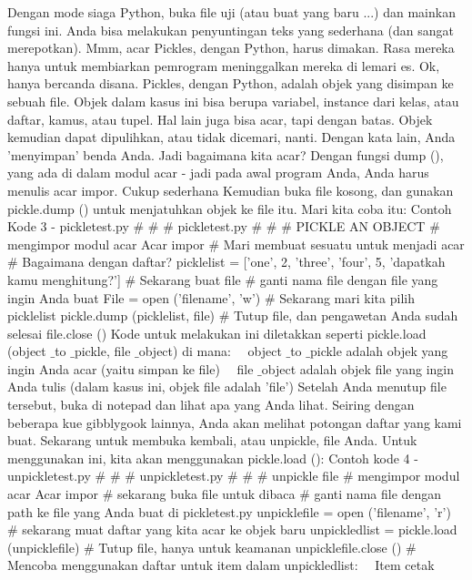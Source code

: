 Dengan mode siaga Python, buka file uji (atau buat yang baru ...) dan mainkan fungsi ini. Anda bisa melakukan penyuntingan teks yang sederhana (dan sangat merepotkan). 
Mmm, acar 
Pickles, dengan Python, harus dimakan. Rasa mereka hanya untuk membiarkan pemrogram meninggalkan mereka di lemari es. 
Ok, hanya bercanda disana. Pickles, dengan Python, adalah objek yang disimpan ke sebuah file. Objek dalam kasus ini bisa berupa variabel, instance dari kelas, atau daftar, kamus, atau tupel. Hal lain juga bisa acar, tapi dengan batas. Objek kemudian dapat dipulihkan, atau tidak dicemari, nanti. Dengan kata lain, Anda 'menyimpan' benda Anda. 
Jadi bagaimana kita acar? Dengan fungsi dump (), yang ada di dalam modul acar - jadi pada awal program Anda, Anda harus menulis acar impor. Cukup sederhana Kemudian buka file kosong, dan gunakan pickle.dump () untuk menjatuhkan objek ke file itu. Mari kita coba itu: 
Contoh Kode 3 - pickletest.py 
 $  \#  $ $  \#  $ $  \#  $ pickletest.py 
 $  \#  $ $  \#  $ $  \#  $ PICKLE AN OBJECT 
 $  \#  $ mengimpor modul acar 
Acar impor 
 $  \#  $ Mari membuat sesuatu untuk menjadi acar 
 $  \#  $ Bagaimana dengan daftar? 
picklelist = ['one', 2, 'three', 'four', 5, 'dapatkah kamu menghitung?']
 $  \#  $ Sekarang buat file
 $  \#  $ ganti nama file dengan file yang ingin Anda buat
File = open ('filename', 'w')
 $  \#  $ Sekarang mari kita pilih picklelist 
pickle.dump (picklelist, file) 
 $  \#  $ Tutup file, dan pengawetan Anda sudah selesai 
file.close ()
Kode untuk melakukan ini diletakkan seperti pickle.load (object $  \_  $to $  \_  $pickle, file $  \_  $object) di mana:
 $  $ $  $ $  $ $  $object $  \_  $to $  \_  $pickle adalah objek yang ingin Anda acar (yaitu simpan ke file) 
 $  $ $  $ $  $ $  $file $  \_  $object adalah objek file yang ingin Anda tulis (dalam kasus ini, objek file adalah 'file') 
Setelah Anda menutup file tersebut, buka di notepad dan lihat apa yang Anda lihat. Seiring dengan beberapa kue gibblygook lainnya, Anda akan melihat potongan daftar yang kami buat. 
Sekarang untuk membuka kembali, atau unpickle, file Anda. Untuk menggunakan ini, kita akan menggunakan pickle.load (): 
Contoh kode 4 - unpickletest.py
{\fontsize{10pt}{10pt}\selectfont  $  \#  $ $  \#  $ $  \#  $ unpickletest.py}
{\fontsize{10pt}{10pt}\selectfont  $  \#  $ $  \#  $ $  \#  $ unpickle file} 
{\fontsize{10pt}{10pt}\selectfont  $  \#  $ mengimpor modul acar} 
{\fontsize{10pt}{10pt}\selectfont Acar impor} 
{\fontsize{10pt}{10pt}\selectfont  $  \#  $ sekarang buka file untuk dibaca}
{\fontsize{10pt}{10pt}\selectfont  $  \#  $ ganti nama file dengan path ke file yang Anda buat di pickletest.py}
{\fontsize{10pt}{10pt}\selectfont unpicklefile = open ('filename', 'r')}
{\fontsize{10pt}{10pt}\selectfont  $  \#  $ sekarang muat daftar yang kita acar ke objek baru}
{\fontsize{10pt}{10pt}\selectfont unpickledlist = pickle.load (unpicklefile)} 
{\fontsize{10pt}{10pt}\selectfont  $  \#  $ Tutup file, hanya untuk keamanan} 
{\fontsize{10pt}{10pt}\selectfont unpicklefile.close ()} 
{\fontsize{10pt}{10pt}\selectfont  $  \#  $ Mencoba menggunakan daftar} 
{\fontsize{10pt}{10pt}\selectfont untuk item dalam unpickledlist:}
{\fontsize{10pt}{10pt}\selectfont  $  $ $  $ $  $ $  $Item cetak} 

